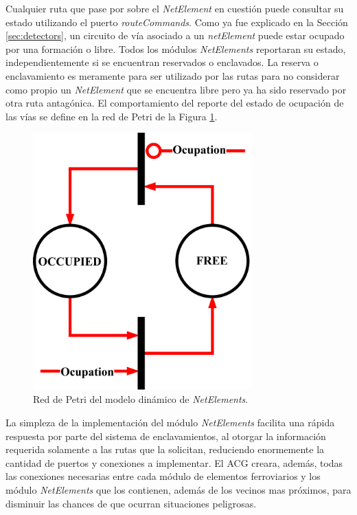 	Cualquier ruta que pase por sobre el \textit{NetElement} en cuestión puede consultar su estado utilizando el puerto \textit{routeCommands}. Como ya fue explicado en la Sección \ref{sec:detectors}, un circuito de vía asociado a un \textit{netElement} puede estar ocupado por una formación o libre. Todos los módulos \textit{NetElements} reportaran su estado, independientemente si se encuentran reservados o enclavados. La reserva o enclavamiento es meramente para ser utilizado por las rutas para no considerar como propio un \textit{NetElement} que se encuentra libre pero ya ha sido reservado por otra ruta antagónica. El comportamiento del reporte del estado de ocupación de las vías se define en la red de Petri de la Figura \ref{fig:NET_Petri}.
	
	\begin{figure}[H]
		\centering
		\includegraphics[width=0.75\textwidth]{Figuras/NET_Petri}
		\centering\caption{Red de Petri del modelo dinámico de \textit{NetElements}.}
		\label{fig:NET_Petri}
	\end{figure}
	
	La simpleza de la implementación del módulo \textit{NetElements} facilita una rápida respuesta por parte del sistema de enclavamientos, al otorgar la información requerida solamente a las rutas que la solicitan, reduciendo enormemente la cantidad de puertos y conexiones a implementar. El ACG creara, además, todas las conexiones necesarias entre cada módulo de elementos ferroviarios y los módulo \textit{NetElements} que los contienen, además de los vecinos mas próximos, para disminuir las chances de que ocurran situaciones peligrosas.